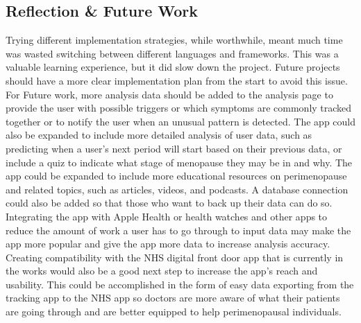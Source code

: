 \subsection{Reflection \& Future Work}
Trying different implementation strategies, while worthwhile, meant much time was wasted switching between different languages and frameworks. This was a valuable learning experience, but it did slow down the project. Future projects should have a more clear implementation plan from the start to avoid this issue. For Future work, more analysis data should be added to the analysis page to provide the user with possible triggers or which symptoms are commonly tracked together or to notify the user when an unusual pattern is detected. The app could also be expanded to include more detailed analysis of user data, such as predicting when a user's next period will start based on their previous data, or include a quiz to indicate what stage of menopause they may be in and why. The app could be expanded to include more educational resources on perimenopause and related topics, such as articles, videos, and podcasts. A database connection could also be added so that those who want to back up their data can do so. Integrating the app with Apple Health or health watches and other apps to reduce the amount of work a user has to go through to input data may make the app more popular and give the app more data to increase analysis accuracy. Creating compatibility with the NHS digital front door app that is currently in the works would also be a good next step to increase the app's reach and usability. This could be accomplished in the form of easy data exporting from the tracking app to the NHS app so doctors are more aware of what their patients are going through and are better equipped to help perimenopausal individuals.